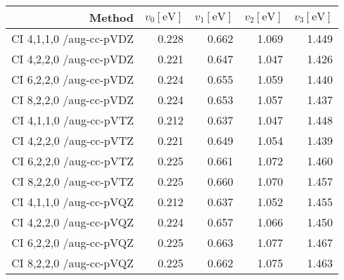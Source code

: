\begin{tabular}{rrrrr}
\toprule
Method & $v_0 [\mathrm{eV}]$ & $v_1 [\mathrm{eV}]$ & $v_2 [\mathrm{eV}]$ & $v_3[\mathrm{eV}]$ \\ \midrule
CI 4,1,1,0 /aug-cc-pVDZ & 0.228 & 0.662 & 1.069 & 1.449\\
CI 4,2,2,0 /aug-cc-pVDZ & 0.221 & 0.647 & 1.047 & 1.426\\
CI 6,2,2,0 /aug-cc-pVDZ & 0.224 & 0.655 & 1.059 & 1.440\\
CI 8,2,2,0 /aug-cc-pVDZ & 0.224 & 0.653 & 1.057 & 1.437\\
CI 4,1,1,0 /aug-cc-pVTZ & 0.212 & 0.637 & 1.047 & 1.448\\
CI 4,2,2,0 /aug-cc-pVTZ & 0.221 & 0.649 & 1.054 & 1.439\\
CI 6,2,2,0 /aug-cc-pVTZ & 0.225 & 0.661 & 1.072 & 1.460\\
CI 8,2,2,0 /aug-cc-pVTZ & 0.225 & 0.660 & 1.070 & 1.457\\
CI 4,1,1,0 /aug-cc-pVQZ & 0.212 & 0.637 & 1.052 & 1.455\\
CI 4,2,2,0 /aug-cc-pVQZ & 0.224 & 0.657 & 1.066 & 1.450\\
CI 6,2,2,0 /aug-cc-pVQZ & 0.225 & 0.663 & 1.077 & 1.467\\
CI 8,2,2,0 /aug-cc-pVQZ & 0.225 & 0.662 & 1.075 & 1.463\\
\bottomrule
\end{tabular}
    